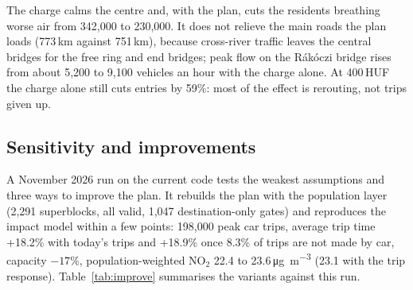 \documentclass[11pt,a4paper]{article}
\begin{document}
The charge calms the centre and, with the plan, cuts the residents breathing worse air from 342,000 to 230,000. It does not relieve the main roads the plan loads (773\,km against 751\,km), because cross-river traffic leaves the central bridges for the free ring and end bridges; peak flow on the Rákóczi bridge rises from about 5,200 to 9,100 vehicles an hour with the charge alone. At 400\,HUF the charge alone still cuts entries by 59\%: most of the effect is rerouting, not trips given up.

\subsection{Sensitivity and improvements}\label{sec:improve}
A November 2026 run on the current code tests the weakest assumptions and three ways to improve the plan. It rebuilds the plan with the population layer (2,291 superblocks, all valid, 1,047 destination-only gates) and reproduces the impact model within a few points: 198,000 peak car trips, average trip time +18.2\% with today's trips and +18.9\% once 8.3\% of trips are not made by car, capacity $-17$\%, population-weighted NO$_2$ 22.4 to 23.6\,\si{\micro\gram\per\cubic\metre} (23.1 with the trip response). Table~\ref{tab:improve} summarises the variants against this run.
\end{document}
